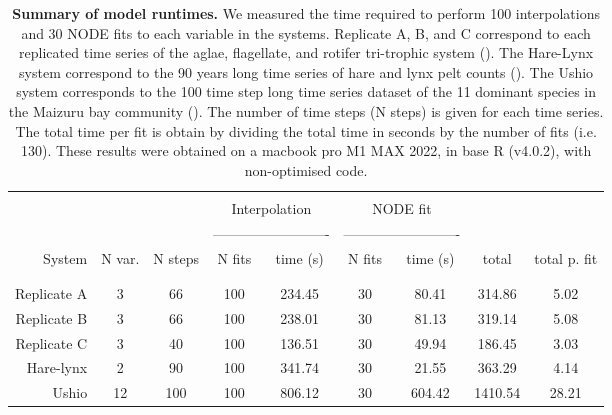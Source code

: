 \documentclass[11pt, oneside]{article}
\begin{document}
\newpage
\begin{table}[H]
\begin{center}
\caption{
\textbf{Summary of model runtimes.}
We measured the time required to perform 100 interpolations and 30 NODE fits to each variable in the systems.
Replicate A, B, and C correspond to each replicated time series of the aglae, flagellate, and rotifer tri-trophic system (\cite{Hiltunen2013}).
The Hare-Lynx system correspond to the 90 years long time series of hare and lynx pelt counts (\cite{Odum1972}).
    The Ushio system corresponds to the 100 time step long time series dataset of the 11 dominant species in the Maizuru bay community (\cite{Ushio2018}).
The number of time steps (N steps) is given for each time series. 
The total time per fit is obtain by dividing the total time in seconds by the number of fits (i.e. 130).
These results were obtained on a macbook pro M1 MAX 2022, in base R (v4.0.2), with non-optimised code.
}
\begin{tabular}{rcccccccc}
\hline
& \\
& & & \multicolumn{2}{c}{Interpolation} & \multicolumn{2}{c}{NODE fit} & &  \\
& & & \multicolumn{2}{c}{-------------------------} & \multicolumn{2}{c}{-------------------------} & &  \\
System & N var. & N steps & N fits & time (s) & N fits & time (s) & total & total p. fit \\
& \\
\hline
& \\
Replicate A & 3  &  66 &  100 & 234.45 & 30 &  80.41 &  314.86 &  5.02 \\
Replicate B & 3  &  66 &  100 & 238.01 & 30 &  81.13 &  319.14 &  5.08 \\
Replicate C & 3  &  40 &  100 & 136.51 & 30 &  49.94 &  186.45 &  3.03 \\
Hare-lynx   & 2  &  90 &  100 & 341.74 & 30 &  21.55 &  363.29 &  4.14 \\
Ushio       & 12 & 100 &  100 & 806.12 & 30 & 604.42 & 1410.54 & 28.21 \\
\end{tabular}
\end{center}
\end{table}
\newpage
\end{document}
